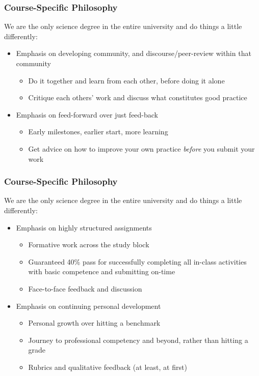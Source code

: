 \begin{frame}
	\frametitle{Course-Specific Philosophy}
	
	We are the only science degree in the entire university and do things a little differently:
	
	\begin{itemize}
		\pause\item Emphasis on developing community, and discourse/peer-review within that community
		\begin{itemize}
			\item Do it together and learn from each other, before doing it alone
			\item Critique each others' work and discuss what constitutes good practice
		\end{itemize}
		\pause\item Emphasis on feed-forward over just feed-back
		\begin{itemize}
			\item Early milestones, earlier start, more learning
			\item Get advice on how to improve your own practice \textit{before} you submit your work
		\end{itemize}
	\end{itemize}
\end{frame}

\begin{frame}
	\frametitle{Course-Specific Philosophy}
	
	We are the only science degree in the entire university and do things a little differently:

	\begin{itemize}
		\item Emphasis on highly structured assignments 
		\begin{itemize}
			\item Formative work across the study block
			\item Guaranteed 40\% pass for successfully completing all in-class activities with basic competence and submitting on-time
			\item Face-to-face feedback and discussion			
		\end{itemize}
		\pause\item Emphasis on continuing personal development
		\begin{itemize}
			\item Personal growth over hitting a benchmark
			\item Journey to professional competency and beyond, rather than hitting a grade
			\item Rubrics and qualitative feedback (at least, at first)			
		\end{itemize}
	\end{itemize}
\end{frame}

